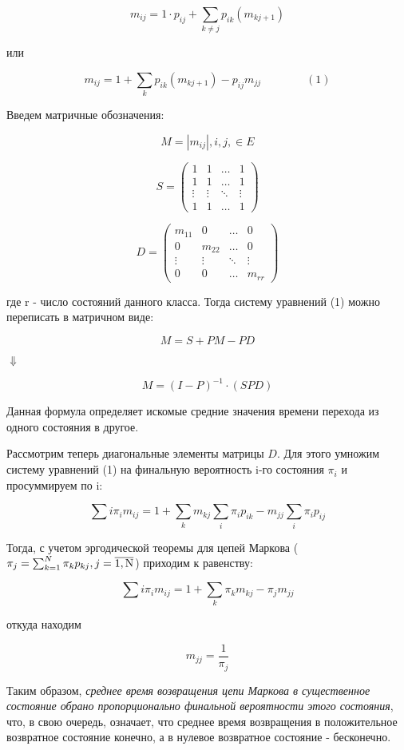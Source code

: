 $$ m_{ij} = 1 \cdot p_{ij} + \sum_{k \neq j} p_{ik}(m_{kj + 1})$$

или

$$ m_{ij} = 1 + \sum_{k} p_{ik}(m_{kj + 1}) - p_{ij}m_{jj} \qquad \qquad (1)$$


Введем матричные обозначения:

$$ M = \left| m_{ij} \right|, i,j, \in E$$

\begin{equation*}
	S = \left(
	\begin{array}{cccc}
	1 & 1 & \ldots & 1\\
	1 & 1 & \ldots & 1\\
	\vdots & \vdots & \ddots & \vdots\\
	1 & 1 & \ldots & 1
	\end{array}
	\right)
\end{equation*}

\begin{equation*}
	D = \left(
	\begin{array}{cccc}
	m_{11} & 0 & \ldots & 0\\
	0 & m_{22} & \ldots & 0\\
	\vdots & \vdots & \ddots & \vdots\\
	0 & 0 & \ldots & m_{rr}
	\end{array}
	\right)
\end{equation*}

где r - число состояний данного класса. Тогда систему уравнений (1) можно переписать в матричном виде:

$$M = S + PM - PD$$

\begin{center}
	$\Downarrow$
\end{center}

$$M = (I - P)^{-1} \cdot (SPD)$$

Данная формула определяет искомые средние значения времени перехода из одного состояния в другое.

\par\medskip

Рассмотрим теперь диагональные элементы матрицы $D$. Для этого умножим систему уравнений (1) на финальную вероятность i-го состояния $\pi_i$ и просуммируем по i:

$$\sum{i} \pi_i m_{ij} = 1 + \sum_{k}m_{kj}\sum_{i}\pi_i p_{ik} - m_{jj}\sum_{i} \pi_i p_{ij}$$

Тогда, с учетом эргодической теоремы для цепей Маркова ($\pi_j = \sum_{k = 1}^{N} \pi_k p_{kj}, j = \overline {\rm 1,N}$) приходим к равенству:

$$\sum{i} \pi_i m_{ij} = 1 + \sum_{k}\pi_k m_{kj} - \pi_j m_{jj}$$

откуда находим 

$$m_{jj} = \frac{1}{\pi_j}$$

Таким образом, \textit{среднее время возвращения цепи Маркова в существенное состояние обрано пропорционально финальной вероятности этого состояния}, что, в свою очередь, означает,
что среднее время возвращения в положительное возвратное состояние конечно, а в нулевое возвратное состояние - бесконечно. 
